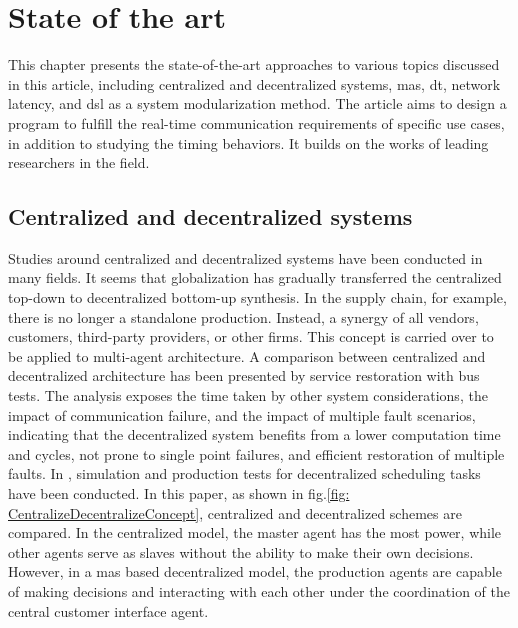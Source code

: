 \chapter{State of the art}\label{chap: S-O-T-A}
This chapter presents the state-of-the-art approaches to various topics 
discussed 
in this article, including centralized and decentralized systems, 
\gls{mas}, \gls{dt}, network latency, 
and \gls{dsl} as a system modularization method. The article aims to 
design a program to fulfill the real-time communication requirements 
of specific use cases, in addition to studying the timing behaviors. 
It builds on the works of leading researchers in the field.


\section{Centralized and decentralized systems}
Studies around centralized and decentralized systems have been conducted 
in many fields. It seems that globalization has gradually transferred the 
centralized top-down to decentralized bottom-up synthesis\cite{ueda_emergent_2004}.   
In the supply chain, for example, there is no longer a standalone production. Instead, 
a synergy of all vendors, customers, third-party providers, or other
ﬁrms\cite{mahapatra_modeling_2003}. This concept is carried over to be applied to multi-agent architecture. A comparison between centralized and decentralized 
architecture has been presented by service restoration with bus tests. The 
analysis exposes the time taken by other system considerations, the impact 
of communication failure, and the impact of multiple fault scenarios, indicating 
that the decentralized system benefits from a lower computation time and cycles, 
not prone to single point failures, and efficient restoration of 
multiple faults\cite{sharma_comparative_2016}. 
In \cite{egger_deployment-friendly_2020}, simulation and production tests 
for decentralized scheduling tasks have been conducted. In this paper, as shown 
in fig.\ref{fig: CentralizeDecentralizeConcept}, centralized and decentralized 
schemes are compared. In the centralized model, the master agent has the most power, 
while other agents serve as slaves without the ability to make their own decisions. 
However, in a \gls{mas} based decentralized model, the production agents are 
capable of making decisions and interacting with each other under the coordination 
of the central customer interface agent. 

